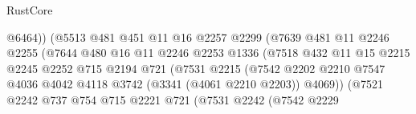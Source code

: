 \begin{lexlean}{RustCore}
\begin{coremodule}
                                        @6464))
                                    (@5513
                                      @481
                                      @451
                                      @11
                                      @16
                                      @2257
                                      @2299
                                      (@7639
                                        @481
                                        @11
                                        @2246
                                        @2255
                                        (@7644
                                          @480
                                          @16
                                          @11
                                          @2246
                                          @2253
                                          @1336
                                          (@7518
                                            @432
                                            @11
                                            @15
                                            @2215
                                            @2245
                                            @2252
                                            @715
                                            @2194
                                            @721
                                            (@7531
                                              @2215
                                              (@7542
                                                @2202
                                                @2210
                                                @7547
                                                @4036
                                                @4042
                                                @4118
                                                @3742
                                                (@3341 (@4061 @2210 @2203))
                                                @4069))
                                            (@7521
                                              @2242
                                              @737
                                              @754
                                              @715
                                              @2221
                                              @721
                                              (@7531
                                                @2242
                                                (@7542
                                                  @2229

\end{coremodule}
\end{lexlean}
